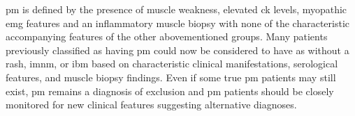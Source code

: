 \gls{pm} is defined by the presence of muscle weakness, elevated \gls{ck} levels, myopathic \gls{emg} features and an inflammatory muscle biopsy with none of the characteristic accompanying features of the other abovementioned groups. Many patients previously classified as having \gls{pm} could now be considered to have \gls{as} without a rash, \gls{imnm}, or \gls{ibm} based on characteristic clinical manifestations, serological features, and muscle biopsy findings.\cite{Meulen2003,Chahin2008,Vilela2015} Even if some true \gls{pm} patients may still exist,\cite{Amato2003a} \gls{pm} remains a diagnosis of exclusion and \gls{pm} patients should be closely monitored for new clinical features suggesting alternative diagnoses.

\begin{table}
	\caption{Clinical features and grouping of the most main \glsdesc{msa}.}
	\label{tab:autoantibodies}
\end{table}

